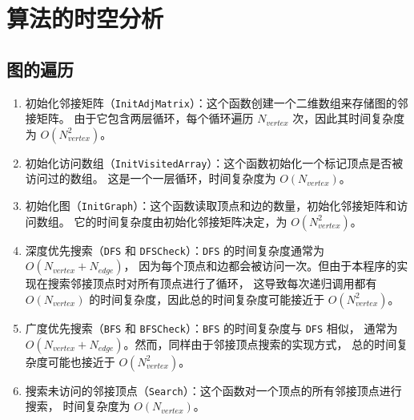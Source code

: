 \documentclass[UTF8]{ctexart}
\begin{document}
\section{算法的时空分析}
\subsection{图的遍历}
\begin{enumerate}
  \item 初始化邻接矩阵（\lstinline{InitAdjMatrix}）：这个函数创建一个二维数组来存储图的邻接矩阵。
  由于它包含两层循环，每个循环遍历 $N_{vertex}$ 次，因此其时间复杂度为 $O(N_{vertex}^2)$。
  \item 初始化访问数组（\lstinline{InitVisitedArray}）：这个函数初始化一个标记顶点是否被访问过的数组。
  这是一个一层循环，时间复杂度为 $O(N_{vertex})$。
  \item 初始化图（\lstinline{InitGraph}）：这个函数读取顶点和边的数量，初始化邻接矩阵和访问数组。
  它的时间复杂度由初始化邻接矩阵决定，为 $O(N_{vertex}^2)$。
  \item 深度优先搜索（\lstinline{DFS} 和 \lstinline{DFSCheck}）：\lstinline{DFS} 的时间复杂度通常为 $O(N_{vertex} + N_{edge})$，
  因为每个顶点和边都会被访问一次。但由于本程序的实现在搜索邻接顶点时对所有顶点进行了循环，
  这导致每次递归调用都有 $O(N_{vertex})$ 的时间复杂度，因此总的时间复杂度可能接近于 $O(N_{vertex}^2)$。
  \item 广度优先搜索（\lstinline{BFS} 和 \lstinline{BFSCheck}）：\lstinline{BFS} 的时间复杂度与 \lstinline{DFS} 相似，
  通常为 $O(N_{vertex} + N_{edge})$。然而，同样由于邻接顶点搜索的实现方式，
  总的时间复杂度可能也接近于 $O(N_{vertex}^2)$。
  \item 搜索未访问的邻接顶点（\lstinline{Search}）：这个函数对一个顶点的所有邻接顶点进行搜索，
  时间复杂度为 $O(N_{vertex})$。
\end{enumerate}
\end{document}
